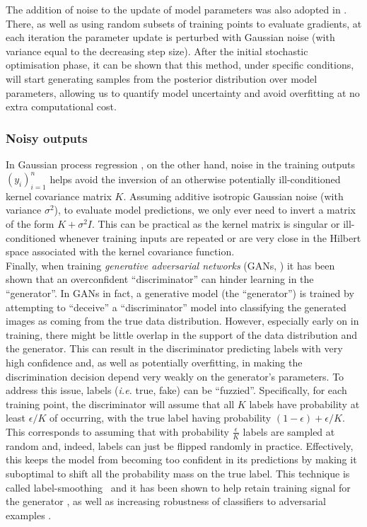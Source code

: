 \documentclass[a4paper, 11pt]{article}
\begin{document}
The addition of noise to the update of model parameters was also adopted in \cite{welling2011bayesian}. There, as well as using random subsets of training points to evaluate gradients, at each iteration the parameter update is perturbed with Gaussian noise (with variance equal to the decreasing step size). After the initial stochastic optimisation phase, it can be shown that this method, under specific conditions, will start generating samples from the posterior distribution over model parameters, allowing us to quantify model uncertainty and avoid overfitting at no extra computational cost.\\

\subsubsection*{Noisy outputs}

In Gaussian process regression \cite{rasmussen2006}, on the other hand, noise in the training outputs \((y_i)_{i=1}^n\) helps avoid the inversion of an otherwise potentially ill-conditioned kernel covariance matrix $K$. Assuming additive isotropic Gaussian noise (with variance \(\sigma^2\)), to evaluate model predictions, we only ever need to invert a matrix of the form \(K + \sigma^2 I\). This can be practical as the kernel matrix is singular or ill-conditioned whenever training inputs are repeated or are very close in the Hilbert space associated with the kernel covariance function.\\

Finally, when training \textit{generative adversarial networks} (GANs, \cite{goodfellow2014generative}) it has been shown that an overconfident ``discriminator'' can hinder learning in the ``generator''. In GANs in fact, a generative model (the ``generator'') is trained by attempting to ``deceive'' a ``discriminator'' model into classifying the generated images as coming from the true data distribution. However, especially early on in training, there might be little overlap in the support of the data distribution and the generator. This can result in the discriminator predicting labels with very high confidence and, as well as potentially overfitting, in making the discrimination decision depend very weakly on the generator's parameters. 
To address this issue, labels (\textit{i.e.} true, fake) can be ``fuzzied''. Specifically, for each training point, the discriminator will assume that all \(K\) labels have probability at least $\epsilon/K$ of occurring, with the true label having probability \((1 - \epsilon) + \epsilon/K\). This corresponds to assuming that with probability \(\frac{\epsilon}{K}\) labels are sampled at random and, indeed, labels can just be flipped randomly in practice. Effectively, this keeps the model from becoming too confident in its predictions by making it suboptimal to shift all the probability mass on the true label. This technique is called label-smoothing~\cite{szegedy2016rethinking} and it has been shown to help retain training signal for the generator \cite{salimans2016improved}, as well as increasing robustness of classifiers to adversarial examples \cite{warde2016perturbation}.\\
\end{document}
